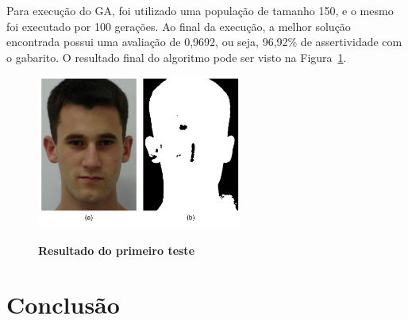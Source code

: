 \documentclass[12pt,oneside,a4paper,english,french,spanish,brazil,]{abntex2}
\begin{document}
Para execução do GA, foi utilizado uma população de tamanho 150, e o mesmo foi executado por 100 gerações. Ao final da execução, a melhor solução encontrada possui uma avaliação de 0,9692, ou seja, 96,92\% de assertividade com o gabarito. O resultado final do algoritmo pode ser visto na Figura~\ref{fig:DES_Primeiro_Teste}.

\begin{figure}[ht]
\centering
\caption{\textbf{Resultado do primeiro teste}}
\includegraphics[width=0.6\textwidth]{imagens/DES_Primeiro_Teste.pdf}
\sourceAuthor
\label{fig:DES_Primeiro_Teste}
\end{figure}


% 

\chapter*[Conclusão]{Conclusão}

\lipsum[31-33]

\postextual






\printindex
\end{document}
